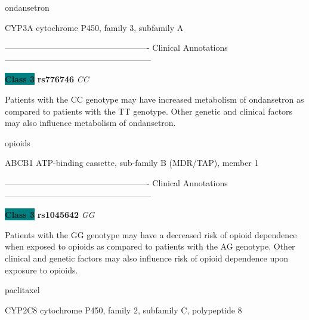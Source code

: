 \documentclass{resume} %
\begin{document}
\begin{rSection}{ ondansetron }
\begin{rSubsection}{ CYP3A }{ cytochrome P450, family 3, subfamily A }{}{}
\item[] ---------------------------------------------------- Clinical Annotations -----------------------------------------------------\newline
\item \textbf{\colorbox{teal} {Class 3}} \textbf{ rs776746 } \textit{ CC }
\item[] Patients with the CC genotype may have increased metabolism of ondansetron as compared to patients with the TT genotype. Other genetic and clinical factors may also influence metabolism of ondansetron.
\end{rSubsection}

\end{rSection}\begin{rSection}{ opioids }
\item[]

\begin{rSubsection}{ ABCB1 }{ ATP-binding cassette, sub-family B (MDR/TAP), member 1 }{}{}
\item[]

\item[] ---------------------------------------------------- Clinical Annotations -----------------------------------------------------\newline
\item \textbf{\colorbox{teal} {Class 3}} \textbf{ rs1045642 } \textit{ GG }
\item[] Patients with the GG genotype may have a decreased risk of opioid dependence when exposed to opioids as compared to patients with the AG genotype. Other clinical and genetic factors may also influence risk of opioid dependence upon exposure to opioids. 
\end{rSubsection}

\end{rSection}\begin{rSection}{ paclitaxel }
\item[]

\begin{rSubsection}{ CYP2C8 }{ cytochrome P450, family 2, subfamily C, polypeptide 8 }{}{}
\item[]


\end{rSubsection}
\end{rSection}
\end{document}

